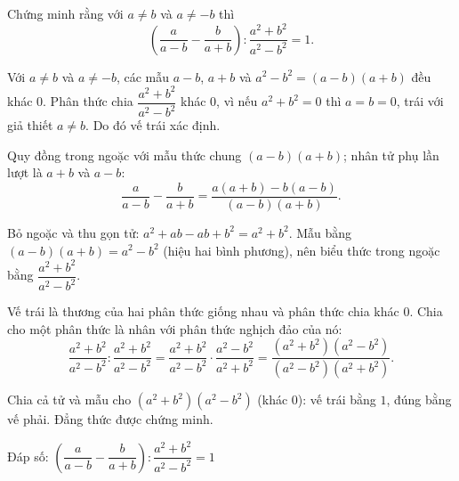 \begin{problem}[8DS-PS-041]
Chứng minh rằng với $a \neq b$ và $a \neq -b$ thì
\[ \left(\dfrac{a}{a - b} - \dfrac{b}{a + b}\right) : \dfrac{a^2 + b^2}{a^2 - b^2} = 1. \]

\begin{solution}
Với $a \neq b$ và $a \neq -b$, các mẫu $a - b$, $a + b$ và $a^2 - b^2 = (a - b)(a + b)$ đều khác $0$. Phân thức chia $\dfrac{a^2 + b^2}{a^2 - b^2}$ khác $0$, vì nếu $a^2 + b^2 = 0$ thì $a = b = 0$, trái với giả thiết $a \neq b$. Do đó vế trái xác định.

Quy đồng trong ngoặc với mẫu thức chung $(a - b)(a + b)$; nhân tử phụ lần lượt là $a + b$ và $a - b$:
\[ \dfrac{a}{a - b} - \dfrac{b}{a + b} = \dfrac{a(a + b) - b(a - b)}{(a - b)(a + b)}. \]

Bỏ ngoặc và thu gọn tử: $a^2 + ab - ab + b^2 = a^2 + b^2$. Mẫu bằng $(a - b)(a + b) = a^2 - b^2$ (hiệu hai bình phương), nên biểu thức trong ngoặc bằng $\dfrac{a^2 + b^2}{a^2 - b^2}$.

Vế trái là thương của hai phân thức giống nhau và phân thức chia khác $0$. Chia cho một phân thức là nhân với phân thức nghịch đảo của nó:
\[ \dfrac{a^2 + b^2}{a^2 - b^2} : \dfrac{a^2 + b^2}{a^2 - b^2} = \dfrac{a^2 + b^2}{a^2 - b^2} \cdot \dfrac{a^2 - b^2}{a^2 + b^2} = \dfrac{(a^2 + b^2)(a^2 - b^2)}{(a^2 - b^2)(a^2 + b^2)}. \]

Chia cả tử và mẫu cho $(a^2 + b^2)(a^2 - b^2)$ (khác $0$): vế trái bằng $1$, đúng bằng vế phải. Đẳng thức được chứng minh.

Đáp số: $\boxed{\left(\dfrac{a}{a - b} - \dfrac{b}{a + b}\right) : \dfrac{a^2 + b^2}{a^2 - b^2} = 1}$
\end{solution}
\end{problem}

